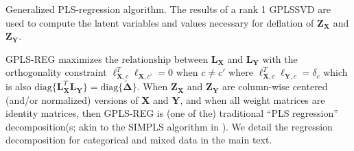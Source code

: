 \documentclass[12pt]{article}
\begin{document}
\begin{algorithm}
\DontPrintSemicolon
\SetAlgoLined
{}
\BlankLine
{}
\caption{Generalized PLS-regression algorithm. The results of a rank 1 GPLSSVD are used to compute the latent variables and values necessary for deflation of ${\mathbf Z}_{{\mathbf X}}$ and ${\mathbf Z}_{{\mathbf Y}}$.}
\label{algo:plscar}
\end{algorithm}

GPLS-REG maximizes the relationship between \({\mathbf L}_{\mathbf X}\)
and \({\mathbf L}_{\mathbf Y}\) with the orthogonality constraint
\({\boldsymbol \ell}_{{\mathbf X},c}^{T}{\boldsymbol \ell}_{{\mathbf X},c'} = 0\)
when \(c \neq c'\) where
\({\boldsymbol \ell}_{{\mathbf X},c}^{T}{\boldsymbol \ell}_{{\mathbf Y},c} = \delta_{c}\)
which is also
\(\mathrm{diag\{}{\mathbf L}_{\mathbf X}^{T}{\mathbf L}_{\mathbf Y}\mathrm{\}} = \mathrm{diag\{}\widetilde{\boldsymbol \Delta}\mathrm{\}}\).
When \({\mathbf Z}_{\mathbf X}\) and \({\mathbf Z}_{\mathbf Y}\) are
column-wise centered (and/or normalized) versions of \({\mathbf X}\) and
\({\mathbf Y}\), and when all weight matrices are identity matrices,
then GPLS-REG is (one of the) traditional ``PLS regression''
decomposition(s; akin to the SIMPLS algorithm in
\citet{tenenhaus_regression_1998}). We detail the regression
decomposition for categorical and mixed data in the main text.
\end{document}
